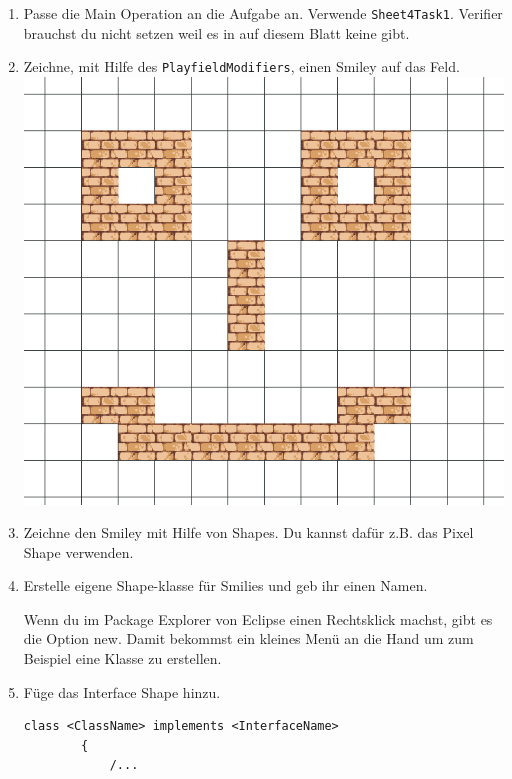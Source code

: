 \begin{enumerate}
    \item Passe die Main Operation an die Aufgabe an. Verwende \lstinline{Sheet4Task1}. Verifier brauchst du nicht setzen weil es in auf diesem Blatt keine gibt.
    \item Zeichne, mit Hilfe des \lstinline{PlayfieldModifiers}, einen Smiley auf das Feld.
    \\ \includegraphics[width=\linewidth]{./figures/smily.png}
    \item Zeichne den Smiley mit Hilfe von Shapes. Du kannst dafür z.B. das Pixel Shape verwenden.
    \item Erstelle eigene Shape-klasse für Smilies und geb ihr einen Namen.
    \begin{Infobox}
        Wenn du im Package Explorer von Eclipse einen Rechtsklick machst, gibt es die Option new.
        Damit bekommst ein kleines Menü an die Hand um zum Beispiel eine Klasse zu erstellen.
    \end{Infobox}
    \item Füge das Interface Shape hinzu.
    \begin{lstlisting}[title=Interface Syntax,frame=ltr]
        class <ClassName> implements <InterfaceName>
        {
            /...
    \end{lstlisting}
    \begin{Infobox}[Interface]

\end{Infobox}
\end{enumerate}
